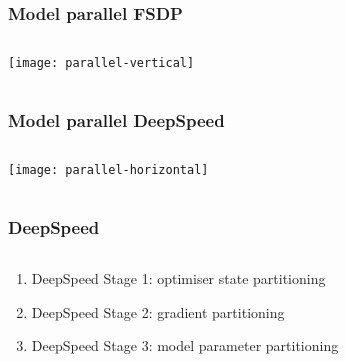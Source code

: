 \documentclass[
	notes=none,
	aspectratio=169
]{beamer}
\begin{document}

\begin{frame}
\frametitle{Model parallel FSDP}

\begin{columns}[T]
\begin{column}[T]{0.7\textwidth}
\setlength{\parskip}{0.5em}

\vspace{-1.5cm}
\texttt{[image: parallel-vertical]}


\end{column}
\end{columns}

\end{frame}
\note{
}


\begin{frame}
\frametitle{Model parallel DeepSpeed}

\begin{columns}[T]
\begin{column}[T]{0.8\textwidth}
\setlength{\parskip}{0.5em}

\vspace{0.0cm}
\texttt{[image: parallel-horizontal]}


\end{column}
\end{columns}

\end{frame}
\note{
}


\begin{frame}
\frametitle{DeepSpeed}

\begin{columns}[T]
\begin{column}[T]{1.0\textwidth}
\setlength{\parskip}{0.5em}

\vspace{-0.5cm}
\begin{enumerate}
\setlength{\parskip}{0.5em}
\item DeepSpeed Stage 1: optimiser state partitioning
\item DeepSpeed Stage 2: gradient partitioning
\item DeepSpeed Stage 3: model parameter partitioning
\end{enumerate}

\end{column}
\end{columns}

\end{frame}
\note{
}
\end{document}
